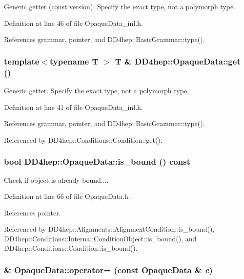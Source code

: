 Generic getter (const version). Specify the exact type, not a polymorph type. 

Definition at line 46 of file OpaqueData\_\-inl.h.

References grammar, pointer, and DD4hep::BasicGrammar::type().\hypertarget{class_d_d4hep_1_1_opaque_data_aab4604ebb0ec5b4de22b84c3b3489ca6}{
\subsubsection[{get}]{\setlength{\rightskip}{0pt plus 5cm}template$<$typename T $>$ {\bf T} \& DD4hep::OpaqueData::get ()}}
\label{class_d_d4hep_1_1_opaque_data_aab4604ebb0ec5b4de22b84c3b3489ca6}


Generic getter. Specify the exact type, not a polymorph type. 

Definition at line 41 of file OpaqueData\_\-inl.h.

References grammar, pointer, and DD4hep::BasicGrammar::type().

Referenced by DD4hep::Conditions::Condition::get().\hypertarget{class_d_d4hep_1_1_opaque_data_a1898df776b793f7d0928a1756137cd1c}{
\subsubsection[{is\_\-bound}]{\setlength{\rightskip}{0pt plus 5cm}bool DD4hep::OpaqueData::is\_\-bound () const}}
\label{class_d_d4hep_1_1_opaque_data_a1898df776b793f7d0928a1756137cd1c}


Check if object is already bound.... 

Definition at line 66 of file OpaqueData.h.

References pointer.

Referenced by DD4hep::Alignments::AlignmentCondition::is\_\-bound(), DD4hep::Conditions::Interna::ConditionObject::is\_\-bound(), and DD4hep::Conditions::Condition::is\_\-bound().\hypertarget{class_d_d4hep_1_1_opaque_data_ab939ef76406d35f26e6913a392741e72}{
\subsubsection[{operator=}]{ \& OpaqueData::operator= (const {\bf OpaqueData} \& {\em c})}}
\label{class_d_d4hep_1_1_opaque_data_ab939ef76406d35f26e6913a392741e72}



